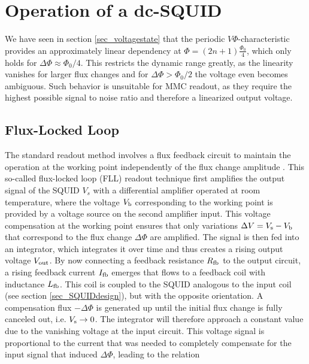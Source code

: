 \section{Operation of a dc-SQUID}

We have seen in section \ref{sec_voltagestate} that the periodic $V\Phi$-characteristic provides an approximately linear dependency at $\Phi = (2n+1)\frac{\Phi_0}{4}$, which only holds for $\Delta\Phi\approx\Phi_0/4$. This restricts the dynamic range greatly, as the linearity vanishes for larger flux changes and for $\Delta\Phi>\Phi_0/2$ the voltage even becomes ambiguous. Such behavior is unsuitable for MMC readout, as they require the highest possible signal to noise ratio and therefore a linearized output voltage.  

\subsection{Flux-Locked Loop}

The standard readout method involves a flux feedback circuit to maintain the operation at the working point independently of the flux change amplitude \cite{Drung2002}. This so-called flux-locked loop (FLL) readout technique first amplifies the output signal of the SQUID $V_s$ with a differential amplifier operated at room temperature, where the voltage $V_{\rm b}$ corresponding to the working point is provided by a voltage source on the second amplifier input. This voltage compensation at the working point ensures that only variations $\Delta V = V_{\rm s}-V_{\rm b}$ that correspond to the flux change $\Delta\Phi$ are amplified. The signal is then fed into an integrator, which integrates it over time and thus creates a rising output voltage $V_{\rm out}$. By now connecting a feedback resistance $R_{\rm fb}$ to the output circuit, a rising feedback current $I_{\rm fb}$ emerges that flows to a feedback coil with inductance $L_{\rm fb}$. This coil is coupled to the SQUID analogous to the input coil (see section \ref{sec_SQUIDdesign}), but with the opposite orientation. A compensation flux $-\Delta\Phi$ is generated up until the initial flux change is fully canceled out, i.e. $V_{\rm s}\to 0$. The integrator will therefore approach a constant value due to the vanishing voltage at the input circuit. This voltage signal is proportional to the current that was needed to completely compensate for the input signal that induced $\Delta\Phi$, leading to the relation 


